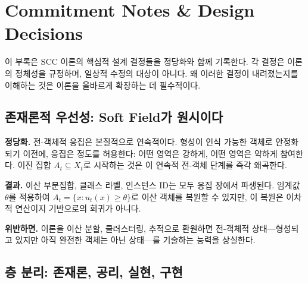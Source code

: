 
\chapter{Commitment Notes \& Design Decisions}
\label{app:commitments}

이 부록은 SCC 이론의 핵심적 설계 결정들을 정당화와 함께 기록한다. 각 결정은 이론의 정체성을 규정하며, 일상적 수정의 대상이 아니다. 왜 이러한 결정이 내려졌는지를 이해하는 것은 이론을 올바르게 확장하는 데 필수적이다.


\section{존재론적 우선성: Soft Field가 원시이다}
\label{app:cn-ontological}

\begin{center}
\end{center}

\textbf{정당화.} 전-객체적 응집은 본질적으로 연속적이다. 형성이 인식 가능한 객체로 안정화되기 이전에, 응집은 정도를 허용한다: 어떤 영역은 강하게, 어떤 영역은 약하게 참여한다. 이진 집합 $A_t \subseteq X_t$로 시작하는 것은 이 연속적 전-객체 단계를 즉각 왜곡한다.

\textbf{결과.} 이산 부분집합, 클래스 라벨, 인스턴스 ID는 모두 응집 장에서 파생된다. 임계값 $\theta$를 적용하여 $A_t = \{x : u_t(x) \geq \theta\}$로 이산 객체를 복원할 수 있지만, 이 복원은 이차적 연산이지 기반으로의 회귀가 아니다.

\textbf{위반하면.} 이론을 이산 분할, 클러스터링, 추적으로 환원하면 전-객체적 상태---형성되고 있지만 아직 완전한 객체는 아닌 상태---를 기술하는 능력을 상실한다.


\section{층 분리: 존재론, 공리, 실현, 구현}
\label{app:cn-layers}

\begin{center}
\end{center}

